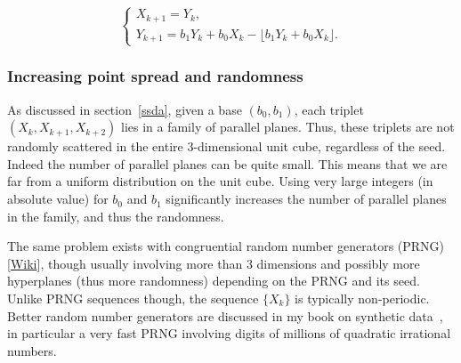 \documentclass[oneside,10pt]{book}
\begin{document}
\begin{equation}
    \begin{cases}
      X_{k+1} = Y_k, \nonumber\\[3pt]
     Y_{k+1} = b_1Y_k + b_0X_k - \lfloor b_1Y_k + b_0X_k \rfloor.\nonumber
    \end{cases} %
\end{equation}

\subsubsection{Increasing point spread and randomness}\label{oidfjb6}

As discussed in section~\ref{ssda}, given a base $(b_0, b_1)$, each triplet $(X_k,X_{k+1},X_{k+2})$ lies in a family of parallel planes. Thus, these triplets are not randomly scattered in the entire 3-dimensional unit cube, regardless of the seed. Indeed the number of parallel planes can be quite small. This means that we are far from a uniform distribution on the unit cube. Using very large integers (in absolute value)  for $b_0$ and $b_1$ significantly increases the number of parallel planes in the family, and thus the randomness. 

The same problem exists 
 with 
\textcolor{index}{congruential random number generators} (PRNG) [\href{https://en.wikipedia.org/wiki/Linear_congruential_generator}{Wiki}], though usually involving more than 3 dimensions and possibly more hyperplanes (thus more randomness) depending on the PRNG and its seed.  Unlike PRNG sequences though, the sequence $\{X_k\}$ is typically non-periodic. Better random number generators are discussed in my book on synthetic data~\cite{vgsynthetic}, in particular a very fast PRNG involving digits of millions of quadratic irrational numbers.
\end{document}

